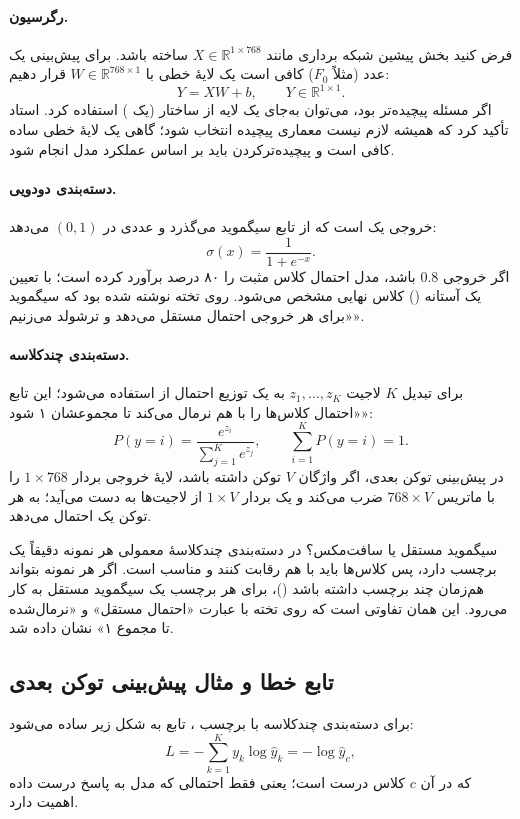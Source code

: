 \paragraph{رگرسیون.} فرض کنید بخش پیشین شبکه برداری مانند $X\in\mathbb{R}^{1\times 768}$ ساخته باشد. برای پیش‌بینی یک عدد (مثلاً $F_0$) کافی است یک لایهٔ خطی با $W\in\mathbb{R}^{768\times1}$ قرار دهیم:
\[
Y = XW + b,\qquad Y\in\mathbb{R}^{1\times1}.
\]
اگر مسئله پیچیده‌تر بود، می‌توان به‌جای یک لایه از ساختار  (یک ) استفاده کرد. استاد تأکید کرد که همیشه لازم نیست معماری پیچیده انتخاب شود؛ گاهی یک لایهٔ خطی ساده کافی است و پیچیده‌ترکردن باید بر اساس عملکرد مدل انجام شود.

\paragraph{دسته‌بندی دودویی.} خروجی یک  است که از تابع سیگموید می‌گذرد و عددی در $(0,1)$ می‌دهد:
\[
\sigma(x)=\frac{1}{1+e^{-x}}.
\]
اگر خروجی $0.8$ باشد، مدل احتمال کلاس مثبت را ۸۰ درصد برآورد کرده است؛ با تعیین یک آستانه () کلاس نهایی مشخص می‌شود. روی تخته نوشته شده بود که سیگموید «برای هر خروجی احتمال مستقل می‌دهد و ترشولد می‌زنیم».

\paragraph{دسته‌بندی چندکلاسه.} برای تبدیل $K$ لاجیت \mbox{$z_1,\dots,z_K$} به یک توزیع احتمال از  استفاده می‌شود؛ این تابع «احتمال کلاس‌ها را با هم نرمال می‌کند تا مجموعشان ۱ شود»:
\[
P(y=i)=\frac{e^{z_i}}{\sum_{j=1}^{K}e^{z_j}},\qquad \sum_{i=1}^{K}P(y=i)=1 .
\]
در پیش‌بینی توکن بعدی، اگر واژگان $V$ توکن داشته باشد، لایهٔ خروجی بردار $1\times768$ را با ماتریس $768\times V$ ضرب می‌کند و یک بردار $1\times V$ از لاجیت‌ها به دست می‌آید؛  به هر توکن یک احتمال می‌دهد.

\begin{addedbox}{سیگموید مستقل یا سافت‌مکس؟}
در دسته‌بندی چندکلاسهٔ معمولی هر نمونه دقیقاً یک برچسب دارد، پس کلاس‌ها باید با هم رقابت کنند و  مناسب است. اگر هر نمونه بتواند هم‌زمان چند برچسب داشته باشد ()، برای هر برچسب یک سیگموید مستقل به کار می‌رود. این همان تفاوتی است که روی تخته با عبارت «احتمال مستقل» و «نرمال‌شده تا مجموع ۱» نشان داده شد.
\end{addedbox}

\subsection{تابع خطا و مثال پیش‌بینی توکن بعدی}
برای دسته‌بندی چندکلاسه با برچسب ، تابع  به شکل زیر ساده می‌شود:
\[
L=-\sum_{k=1}^{K}y_k\log \hat y_k = -\log \hat y_{c},
\]
که در آن $c$ کلاس درست است؛ یعنی فقط احتمالی که مدل به پاسخ درست داده اهمیت دارد.

